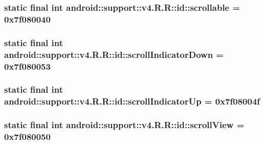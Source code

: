 \hypertarget{classandroid_1_1support_1_1v4_1_1_r_1_1id_66eebd4fe4923279cbdfce4f59aa42d5}{
\subsubsection[{scrollable}]{\setlength{\rightskip}{0pt plus 5cm}static final int android::support::v4.R.R::id::scrollable = 0x7f080040}}
\label{classandroid_1_1support_1_1v4_1_1_r_1_1id_66eebd4fe4923279cbdfce4f59aa42d5}


\hypertarget{classandroid_1_1support_1_1v4_1_1_r_1_1id_dcfeedade22463598ce06f4271b901b8}{
\subsubsection[{scrollIndicatorDown}]{\setlength{\rightskip}{0pt plus 5cm}static final int android::support::v4.R.R::id::scrollIndicatorDown = 0x7f080053}}
\label{classandroid_1_1support_1_1v4_1_1_r_1_1id_dcfeedade22463598ce06f4271b901b8}


\hypertarget{classandroid_1_1support_1_1v4_1_1_r_1_1id_35657a60e9a119f938ad5331d0bca067}{
\subsubsection[{scrollIndicatorUp}]{\setlength{\rightskip}{0pt plus 5cm}static final int android::support::v4.R.R::id::scrollIndicatorUp = 0x7f08004f}}
\label{classandroid_1_1support_1_1v4_1_1_r_1_1id_35657a60e9a119f938ad5331d0bca067}


\hypertarget{classandroid_1_1support_1_1v4_1_1_r_1_1id_97dde9a740e120103594e0a3ff07d4b2}{
\subsubsection[{scrollView}]{\setlength{\rightskip}{0pt plus 5cm}static final int android::support::v4.R.R::id::scrollView = 0x7f080050}}
\label{classandroid_1_1support_1_1v4_1_1_r_1_1id_97dde9a740e120103594e0a3ff07d4b2}


